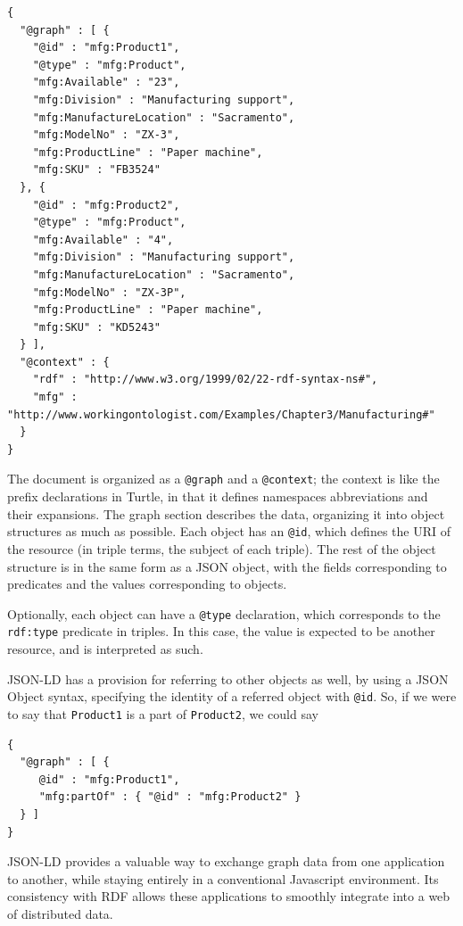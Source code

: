 \begin{lstlisting}
{
  "@graph" : [ {
    "@id" : "mfg:Product1",
    "@type" : "mfg:Product",
    "mfg:Available" : "23",
    "mfg:Division" : "Manufacturing support",
    "mfg:ManufactureLocation" : "Sacramento",
    "mfg:ModelNo" : "ZX-3",
    "mfg:ProductLine" : "Paper machine",
    "mfg:SKU" : "FB3524"
  }, {
    "@id" : "mfg:Product2",
    "@type" : "mfg:Product",
    "mfg:Available" : "4",
    "mfg:Division" : "Manufacturing support",
    "mfg:ManufactureLocation" : "Sacramento",
    "mfg:ModelNo" : "ZX-3P",
    "mfg:ProductLine" : "Paper machine",
    "mfg:SKU" : "KD5243"
  } ],
  "@context" : {
    "rdf" : "http://www.w3.org/1999/02/22-rdf-syntax-ns#",
    "mfg" : "http://www.workingontologist.com/Examples/Chapter3/Manufacturing#"
  }
}
\end{lstlisting}


The document is organized as a \texttt{@graph} and a \texttt{@context}; the context
is like the prefix declarations in Turtle, in that it defines namespaces
abbreviations and their expansions. The graph section describes the
data, organizing it into object structures as much as possible. Each
object has an \texttt{@id}, which defines the URI of the resource (in triple
terms, the subject of each triple). The rest of the object structure is
in the same form as a JSON object, with the fields corresponding to
predicates and the values corresponding to objects.

Optionally, each object can have a \texttt{@type} declaration, which corresponds
to the \texttt{rdf:type} predicate in triples. In this case, the value is
expected to be another resource, and is interpreted as such.

JSON-LD has a provision for referring to other objects as well, by using
a JSON Object syntax, specifying the identity of a referred object with
\texttt{@id}. So, if we were to say that \texttt{Product1} is a part of \texttt{Product2}, we could
say

\begin{lstlisting}
{
  "@graph" : [ {
     @id" : "mfg:Product1",
     "mfg:partOf" : { "@id" : "mfg:Product2" }
  } ]
}    
\end{lstlisting}

JSON-LD provides a valuable way to exchange graph data from one
application to another, while staying entirely in a conventional
Javascript environment. Its consistency with RDF allows these
applications to smoothly integrate into a web of distributed data.

